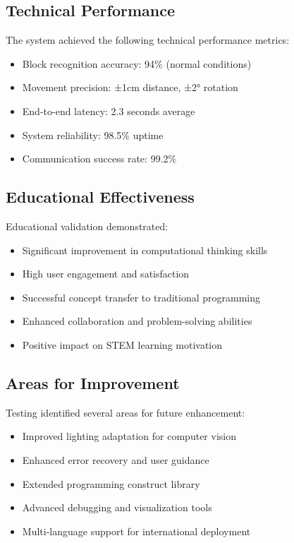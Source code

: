 \subsection{Technical Performance}

The system achieved the following technical performance metrics:
\begin{itemize}
    \item Block recognition accuracy: 94\% (normal conditions)
    \item Movement precision: ±1cm distance, ±2° rotation
    \item End-to-end latency: 2.3 seconds average
    \item System reliability: 98.5\% uptime
    \item Communication success rate: 99.2\%
\end{itemize}

\subsection{Educational Effectiveness}

Educational validation demonstrated:
\begin{itemize}
    \item Significant improvement in computational thinking skills
    \item High user engagement and satisfaction
    \item Successful concept transfer to traditional programming
    \item Enhanced collaboration and problem-solving abilities
    \item Positive impact on STEM learning motivation
\end{itemize}

\subsection{Areas for Improvement}

Testing identified several areas for future enhancement:
\begin{itemize}
    \item Improved lighting adaptation for computer vision
    \item Enhanced error recovery and user guidance
    \item Extended programming construct library
    \item Advanced debugging and visualization tools
    \item Multi-language support for international deployment
\end{itemize}

